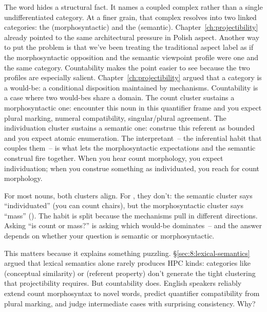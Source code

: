 The word  hides a structural fact. It names a coupled complex rather than a single undifferentiated category. At a finer grain, that complex resolves into two linked categories: the  (morphosyntactic) and the  (semantic). Chapter~\ref{ch:projectibility} already pointed to the same architectural pressure in Polish aspect. Another way to put the problem is that we've been treating the traditional aspect label as if the morphosyntactic opposition and the semantic viewpoint profile were one and the same category. Countability makes the point easier to see because the two profiles are especially salient. Chapter~\ref{ch:projectibility} argued that a category is a would-be: a conditional disposition maintained by mechanisms. Countability is a case where two would-bes share a domain. The count cluster sustains a morphosyntactic one: encounter this noun in this quantifier frame and you expect plural marking, numeral compatibility, singular/plural agreement. The individuation cluster sustains a semantic one: construe this referent as bounded and you expect atomic enumeration. The interpretant~-- the inferential habit that couples them~-- is what lets the morphosyntactic expectations and the semantic construal fire together. When you hear count morphology, you expect individuation; when you construe something as individuated, you reach for count morphology.

For most nouns, both clusters align. For , they don't: the semantic cluster says \enquote{individuated} (you can count chairs), but the morphosyntactic cluster says \enquote{mass} (\ungram{}). The habit is split because the mechanisms pull in different directions. Asking \enquote{is  count or mass?} is asking which would-be dominates~-- and the answer depends on whether your question is semantic or morphosyntactic.

This matters because it explains something puzzling. §\ref{sec:8:lexical-semantics} argued that lexical semantics alone rarely produces HPC kinds: categories like  (conceptual similarity) or  (referent property) don't generate the tight clustering that projectibility requires. But countability does. English speakers reliably extend count morphosyntax to novel words, predict quantifier compatibility from plural marking, and judge intermediate cases with surprising consistency. Why?

